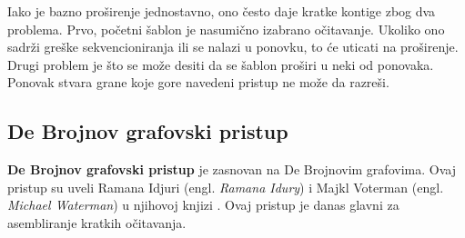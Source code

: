 \documentclass[12pt,oneside]{memoir}
\begin{document}
Iako je bazno proširenje jednostavno, ono često daje kratke kontige zbog dva problema. Prvo, početni šablon je nasumično izabrano očitavanje. Ukoliko ono sadrži greške sekvencioniranja ili se nalazi u ponovku, to će uticati na proširenje. Drugi problem je što se može desiti da se šablon proširi u neki od ponovaka. Ponovak stvara grane koje gore navedeni pristup ne može da razreši.

\begin{comment}
Da bismo rešili prvi problem, biramo očitavanje za šablon, ako je malo verovatno da ono sadrži grešku sekvenciranja ili ako je malo verovatno da će biti u ponovljenom regionu. Koristeći ideju u sekciji 5.3.1, broje se frekvencije svih k-mera svih očitavanja. Očitavanje R se bira za šablon, ako su frekvencije svih njegovih k-mera unutar nekih korisnički definisanih pragova $\theta_{min}$ i $\theta_{max}$. Ako je broj pojavljivanja nekog k-mera manji od $\theta_{min}$, R će verovatno sadržati grešku sekvenciranja. Ako je broj pojavljivanja nekog k-mera veći od $\theta_{max}$, R će se verovatno naći u ponovljenom regionu. Ova dva praga mogu biti određena proučavanjem histograma frekvencija svih k-mera ulaznih sekvenci očitavanja.

Za drugi problem, rešenje je korišćenje informacija o povezivanju paired-end očitavanja za rešavanje nasumičnosti. Ovaj pristup je korišćen od strane $PE-asemblera [9]$. Figura 5.14 ilustruje tu ideju. Pretpostavimo da možemo proširiti šablon koristeći 2 različita očitavanja (crno i sivo). Ne možemo odlučiti koje je ispravo (pogledati Figuru 5.14(a)). Kako svako očitavanje ima svog para, možemo biti u stanju da donesemo odluku. Postoje 2 slučaja. U prvom slučaju, ako parnjak crnom očitavanju može biti poravnat sa šablonom, možemo verovati crnom očitavanju (Figura 5.14(b)). U drugom slučaju, pretpostavimo  da postoji nekoliko očitavanja R koja su poravnata sa šablonom i parnjaci od R mogu biti poravnati sa panjakom crnog očitavanja (pogledati Figuru 5.14(c)). Onda možemo verovati i crnom očitavanju. Drugim rečima, informacije o povezanosti paired-end očitavanja mogu pomoći u  filtriranju onih lažno pozitivnih poravnanja.
\end{comment}

\subsection{De Brojnov grafovski pristup}
\label{odeljak:DeBrojnovGraf}

\textbf{De Brojnov grafovski pristup} je zasnovan na De Brojnovim grafovima. Ovaj pristup su uveli Ramana Idjuri (engl. \textit{Ramana Idury}) i Majkl Voterman (engl. \textit{Michael Waterman}) u njihovoj knjizi \cite{Voterman}. Ovaj pristup je danas glavni za asembliranje kratkih očitavanja.
\end{document}

